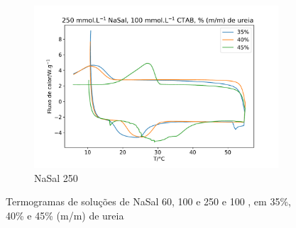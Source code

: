 \begin{figure}
	\hspace{4cm} \begin{subfigure}{0.5\textwidth}
		\centering
		\includegraphics[width=\textwidth]{./imagens/dsc/NaSal250}
		\caption{NaSal 250\mM}
		\label{fig:DSC_NaSal250}
	\end{subfigure}

	\caption{Termogramas de soluções de NaSal 60, 100 e 250 \mM{} e \CTAB{} 100 \mM{}, em 35\%, 40\% e 45\% (m/m) de ureia}
	\label{fig:DSC_NaSals}  %

\end{figure}

%	
%	
%

		
	
